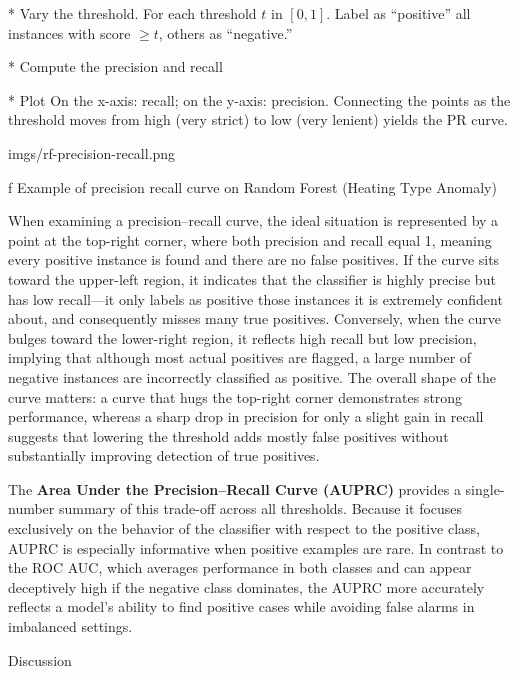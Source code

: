* Vary the threshold. For each threshold $t$ in $[0,1]$. Label as “positive” all instances with score $≥t$, others as “negative.”

* Compute the precision and recall

* Plot On the x-axis: recall; on the y-axis: precision. Connecting the points as the threshold moves from high (very strict) to low (very lenient) yields the PR curve.
\enditems

\medskip
{}
\picw=10cm \cinspic imgs/rf-precision-recall.png
\caption/f Example of precision recall curve on Random Forest (Heating Type Anomaly)
\medskip

When examining a precision–recall curve, the ideal situation is represented by a point at the top-right corner, where both precision and recall equal 1, meaning every positive instance is found and there are no false positives. If the curve sits toward the upper-left region, it indicates that the classifier is highly precise but has low recall—it only labels as positive those instances it is extremely confident about, and consequently misses many true positives. Conversely, when the curve bulges toward the lower-right region, it reflects high recall but low precision, implying that although most actual positives are flagged, a large number of negative instances are incorrectly classified as positive. The overall shape of the curve matters: a curve that hugs the top-right corner demonstrates strong performance, whereas a sharp drop in precision for only a slight gain in recall suggests that lowering the threshold adds mostly false positives without substantially improving detection of true positives.

The {\bf Area Under the Precision–Recall Curve (AUPRC)} provides a single-number summary of this trade-off across all thresholds. Because it focuses exclusively on the behavior of the classifier with respect to the positive class, AUPRC is especially informative when positive examples are rare. In contrast to the ROC AUC, which averages performance in both classes and can appear deceptively high if the negative class dominates, the AUPRC more accurately reflects a model’s ability to find positive cases while avoiding false alarms in imbalanced settings.





\sec Discussion